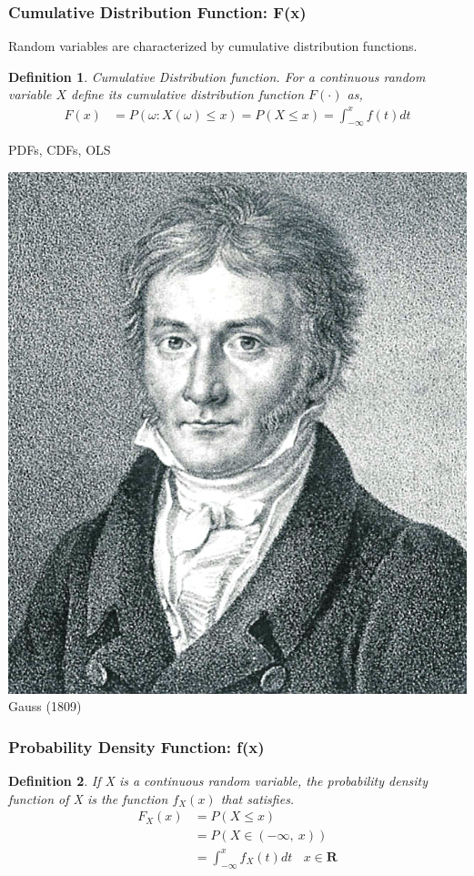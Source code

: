 \documentclass[aspectratio=169, handout]{beamer}
\newtheorem{defn}{Definition}
\numberwithin{equation}{section}
\begin{document}
\begin{frame}
\frametitle{Cumulative Distribution Function: F(x)} 

Random variables are characterized by cumulative distribution functions.\pause

\begin{defn} 
Cumulative Distribution function.  For a continuous random variable $X$ define its cumulative distribution function $F(\cdot )$ as, 
\begin{align*} 
F(x) &=P(\omega: X(\omega)\leq x)= P(X \leq x) = \int_{-\infty} ^{x} f(t) dt 
\end{align*}
\end{defn}
\end{frame}

\begin{frame}{PDFs, CDFs, OLS}
\begin{center}
\includegraphics[width=1.8 in]{images/Gauss.jpeg}\\
Gauss (1809)
\end{center}
\end{frame}

\begin{frame}
\frametitle{Probability Density Function: f(x)}
\begin{defn}
If X is a continuous random variable, the probability density function of X is the function $f_X(x)$ that satisfies.
\begin{align*}
F_X(x)&=P(X\leq x)\\
&=P(X\in (-\infty,\ x))\\
&=\int_{-\infty}^{x} f_X(t)dt\ \ \ \ x\in \textbf{R}
\end{align*}
\end{defn}
\pause

\begin{center}
\end{center}
\end{frame}
\end{document}
